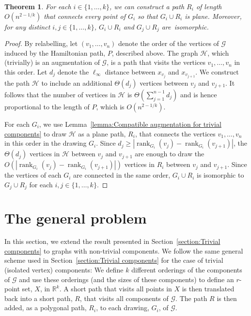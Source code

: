 \documentclass[11pt]{patmorin}
\newtheorem{theorem}{Theorem}[section]
\DeclareMathOperator{\rank}{rank}
\newcommand{\R}{\mathbb{R}}
\begin{document}
\begin{theorem}\label{theorem:points}
For each $i\in \{1,\dots,k\}$, we can construct a path $R_i$ of length $O(n^{2-1/k})$ that connects every point of $G_i$ so that $G_i\cup R_i$ is plane. Moreover, for any distinct $i,j\in \{1,\dots,k\}$, $G_i\cup R_i$ and $G_j\cup R_j$ are~isomorphic.
\end{theorem}
\begin{proof}
By relabelling, let $(v_1, \ldots, v_n)$ denote the order of the vertices of $\mathcal{G}$ induced by the Hamiltonian path, $P$, described above.  The graph $\mathcal{H}$, which (trivially) is an augmentation of $\mathcal{G}$, is a path that visits the vertices $v_1,\ldots,v_n$ in this order. Let $d_j$ denote the $\ell_\infty$ distance between $x_{v_j}$ and $x_{v_{j+1}}$. 
We construct the path $\mathcal{H}$ to include an additional $\Theta(d_j)$ vertices between $v_{j}$ and $v_{j+1}$.  
It follows that the number of vertices
in $\mathcal{H}$ is $\Theta(\sum_{j = 1}^{n-1} d_j)$ and is hence proportional to the length of $P$, which is $O(n^{2-1/k})$.

For each $G_i$, we use Lemma~\ref{lemma:Compatible augmentation for trivial components} to draw $\mathcal{H}$ as a plane path, $R_i$,
that connects the vertices $v_1,\ldots,v_n$ in this order in the drawing $G_i$.
Since $d_j\ge |\rank_{G_i}(v_j) - \rank_{G_i}(v_{j+1})|$, the $\Theta(d_j)$
vertices in $\mathcal{H}$ between $v_j$ and $v_{j+1}$ are enough to
draw the $O(|\rank_{G_i}(v_j) - \rank_{G_i}(v_{j+1})|)$ vertices in $R_i$
between $v_j$ and $v_{j+1}$.
Since the vertices of each $G_i$ are connected in the same order,
$G_i\cup R_i$ is isomorphic to $G_j\cup R_j$ for each $i,j\in\{1,\ldots,k\}$.
\end{proof}


\section{The general problem}\label{section:General}
In this section, we extend the result presented in
Section~\ref{section:Trivial components} to graphs with
non-trivial components.  We follow the same general scheme used in
Section~\ref{section:Trivial components} for the case of trivial
(isolated vertex) components:  We define $k$ different
orderings of the components of $\mathcal G$ and use these orderings (and
the sizes of these components) to define an $r$-point set, $X$, in $\R^k$. A
short path that visits all points in $X$ is then translated back into
a short path, $R$, that visits all components of $\mathcal G$. The path
$R$ is then
added, as a polygonal path, $R_i$, to each drawing, $G_i$, of $\mathcal G$.
\end{document}
